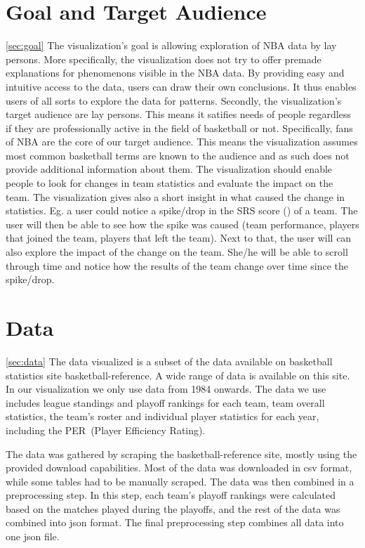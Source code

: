 \documentclass{sigchi}
\begin{document}
\section{Goal and Target Audience}\ref{sec:goal}
The visualization's goal is allowing exploration of NBA data by lay persons.
More specifically, the visualization does not try to offer premade explanations
for phenomenons visible in the NBA data. By providing easy and intuitive access
to the data, users can draw their own conclusions. It thus enables users of all 
sorts to explore the data for patterns.
Secondly, the visualization's target audience are lay persons. This means it 
satifies needs of people regardless if they are professionally active in the 
field of basketball or not. Specifically, fans of NBA are the core of our target
audience. This means the visualization assumes most common basketball terms are
known to the audience and as such does not provide additional information about 
them.
The visualization should enable people to look for changes in team statistics 
and evaluate the impact on the team. The visualization gives also a short insight
in what caused the change in statistics. Eg. a user could notice a spike/drop in 
the SRS score () of a team. The user will then be able to see how the spike was 
caused (team performance, players that joined the team, players that left the 
team). Next to that, the user will can also explore the impact of the change on
the team. She/he will be able to scroll through time and notice how the results of
the team change over time since the spike/drop.

\section{Data}\ref{sec:data}
The data visualized is a subset of the data available on basketball statistics
site basketball-reference\cite{basketball-reference}. A wide range of data is
available on this site. In our visualization we only use data from 1984 onwards.
The data we use includes league standings and playoff rankings for each team,
team overall statistics, the team's roster and individual player statistics 
for each year, including the PER~(Player Efficiency Rating). 

The data was gathered by scraping the basketball-reference site, mostly using
the provided download capabilities. Most of the data was downloaded in csv
format, while some tables had to be manually scraped. The data was then combined
in a preprocessing step. In this step, each team's playoff rankings were
calculated based on the matches played during the playoffs, and the rest of the
data was combined into json format. The final preprocessing step combines all
data into one json file.
\end{document}
